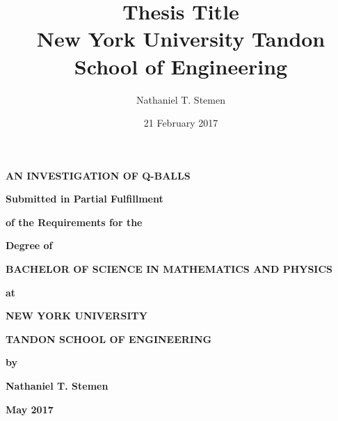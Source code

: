 \documentclass[12pt]{report}
\title{%
    {Thesis Title}\\
    {\large New York University Tandon School of Engineering}\\
}
\author{Nathaniel T. Stemen}
\date{21 February 2017}
\theoremstyle{definition}
\begin{document}
\begin{center}
    \begin{minipage}{0.75\linewidth}
        \centering
        \textbf{\Large{AN INVESTIGATION OF Q-BALLS}} \\ \vspace{1.cm}

        \textbf{Submitted in Partial Fulfillment} \\ \vspace{0.5cm}

        \textbf{of the Requirements for the} \\ \vspace{0.5cm}

        \textbf{Degree of} \\ \vspace{0.75cm}

        \textbf{BACHELOR OF SCIENCE IN MATHEMATICS AND PHYSICS}\\ \vspace{0.75cm}

        \textbf{at} \\ \vspace{0.5cm}

        \textbf{NEW YORK UNIVERSITY} \\ \vspace{0.5cm}

        \textbf{TANDON SCHOOL OF ENGINEERING} \\ \vspace{0.5cm}

        \textbf{by} \\ \vspace{0.5cm}

        \textbf{Nathaniel T. Stemen} \\ \vspace{0.5cm}

        \textbf{May 2017}
    \end{minipage}
\end{center}
\clearpage

\newpage
\pagestyle{plain}

\noindent
\end{document}
